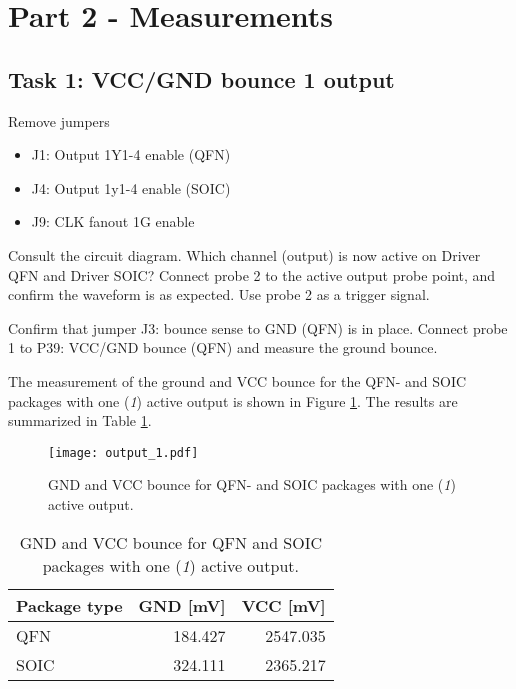 \documentclass[../main.tex]{subfiles}
\begin{document}
\section{Part 2 - Measurements}

\subsection{Task 1: VCC/GND bounce 1 output}

Remove jumpers

\begin{itemize}
    \item J1: Output 1Y1-4 enable (QFN)
    \item J4: Output 1y1-4 enable (SOIC)
    \item J9: CLK fanout 1G enable
\end{itemize}

Consult the circuit diagram. Which channel (output) is now active on Driver QFN and Driver SOIC? Connect probe 2 to the active output probe point, and confirm the waveform is as expected. Use probe 2 as a trigger signal.

\vspace{10pt}

Confirm that jumper J3: bounce sense to GND (QFN) is in place. Connect probe 1 to P39: VCC/GND bounce (QFN) and measure the ground bounce.

\solution

The measurement of the ground and VCC bounce for the QFN- and SOIC packages with one (\textit{1}) active output is shown in Figure \ref{fig:gnd_vcc_output_1}. The results are summarized in Table \ref{tab:output_1}.

\begin{figure}[h]
    \centering
    \texttt{[image: output\_1.pdf]}
    \caption{GND and VCC bounce for QFN- and SOIC packages with one (\textit{1}) active output.}
    \label{fig:gnd_vcc_output_1}
\end{figure}

\begin{table}[h]
    \centering
    \begin{tabular}{l | r r}
        \toprule[1pt]
        Package type    & GND [mV]  & VCC [mV]\\
        \midrule
        QFN             & 184.427   & 2547.035  \\
        SOIC            & 324.111   & 2365.217  \\
        \bottomrule[1pt]
    \end{tabular}
    \caption{GND and VCC bounce for QFN and SOIC packages with one (\textit{1}) active output.}
    \label{tab:output_1}
\end{table}
\end{document}
